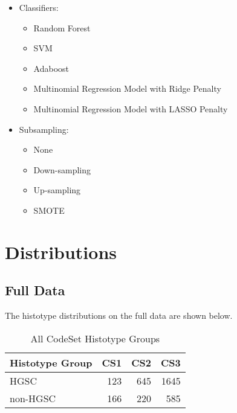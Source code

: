 \documentclass[
]{report}
\providecommand{\tightlist}{%
  \setlength{\itemsep}{0pt}\setlength{\parskip}{0pt}}
\begin{document}
\begin{itemize}
\item
  Classifiers:

  \begin{itemize}
  \tightlist
  \item
    Random Forest
  \item
    SVM
  \item
    Adaboost
  \item
    Multinomial Regression Model with Ridge Penalty
  \item
    Multinomial Regression Model with LASSO Penalty
  \end{itemize}
\item
  Subsampling:

  \begin{itemize}
  \tightlist
  \item
    None
  \item
    Down-sampling
  \item
    Up-sampling
  \item
    SMOTE
  \end{itemize}
\end{itemize}

\hypertarget{distributions}{%
\chapter{Distributions}\label{distributions}}

\hypertarget{full-data}{%
\section{Full Data}\label{full-data}}

The histotype distributions on the full data are shown below.

\begin{table}

\caption{\label{tab:dist-all-hist-gr}All CodeSet Histotype Groups}
\centering
\begin{tabular}[t]{l|r|r|r}
\hline
Histotype Group & CS1 & CS2 & CS3\\
\hline
HGSC & 123 & 645 & 1645\\
\hline
non-HGSC & 166 & 220 & 585\\
\hline
\end{tabular}
\end{table}
\end{document}
